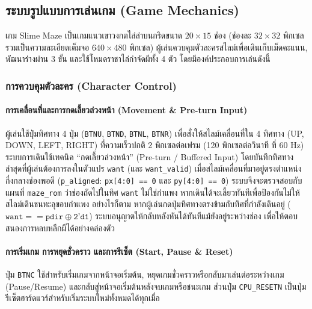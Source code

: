 \clearpage
{}

\subsection{ระบบรูปแบบการเล่นเกม (Game Mechanics)}

เกม Slime Maze เป็นเกมแนวเขาวงกตไล่ล่าบนกริดขนาด $20\times15$ ช่อง (ช่องละ $32\times32$ พิกเซล รวมเป็นความละเอียดเต็มจอ $640\times480$ พิกเซล) ผู้เล่นควบคุมตัวละครสไลม์เพื่อเดินเก็บเม็ดคะแนน, พัฒนาร่างผ่าน 3 ขั้น และใช้โหมดราชาไล่กำจัดผีทั้ง 4 ตัว โดยมีองค์ประกอบการเล่นดังนี้

\subsubsection{การควบคุมตัวละคร (Character Control)}

\paragraph{การเคลื่อนที่และการกดเลี้ยวล่วงหน้า (Movement \& Pre-turn Input)}
ผู้เล่นใช้ปุ่มทิศทาง 4 ปุ่ม (\texttt{BTNU}, \texttt{BTND}, \texttt{BTNL}, \texttt{BTNR}) เพื่อสั่งให้สไลม์เคลื่อนที่ใน 4 ทิศทาง (UP, DOWN, LEFT, RIGHT) ที่ความเร็วปกติ 2 พิกเซลต่อเฟรม (120 พิกเซลต่อวินาที ที่ 60 Hz) ระบบการเดินใช้เทคนิค “กดเลี้ยวล่วงหน้า” (Pre-turn / Buffered Input) โดยบันทึกทิศทางล่าสุดที่ผู้เล่นต้องการลงในตัวแปร \texttt{want} (และ \texttt{want\_valid}) เมื่อสไลม์เคลื่อนที่มาอยู่ตรงตำแหน่งกึ่งกลางช่องพอดี (\texttt{p\_aligned}: \texttt{px[4:0] == 0} และ \texttt{py[4:0] == 0}) ระบบจึงจะตรวจสอบกับแผนที่ \texttt{maze\_rom} ว่าช่องถัดไปในทิศ \texttt{want} ไม่ใช่กำแพง หากเดินได้จะเลี้ยวทันทีเพื่อป้องกันไม่ให้สไลม์เดินชนทะลุขอบกำแพง อย่างไรก็ตาม หากผู้เล่นกดปุ่มทิศทางตรงข้ามกับทิศที่กำลังเดินอยู่ ($\texttt{want} == \texttt{pdir} \oplus \texttt{2'd1}$) ระบบอนุญาตให้กลับหลังหันได้ทันทีแม้ยังอยู่ระหว่างช่อง เพื่อให้ตอบสนองการหลบหลีกผีได้อย่างคล่องตัว

\paragraph{การเริ่มเกม การหยุดชั่วคราว และการรีเซ็ต (Start, Pause \& Reset)}
ปุ่ม \texttt{BTNC} ใช้สำหรับเริ่มเกมจากหน้าจอเริ่มต้น, หยุดเกมชั่วคราวหรือกลับมาเล่นต่อระหว่างเกม (Pause/Resume) และกลับสู่หน้าจอเริ่มต้นหลังจบเกมหรือชนะเกม ส่วนปุ่ม \texttt{CPU\_RESETN} เป็นปุ่มรีเซ็ตฮาร์ดแวร์สำหรับเริ่มระบบใหม่ทั้งหมดได้ทุกเมื่อ

